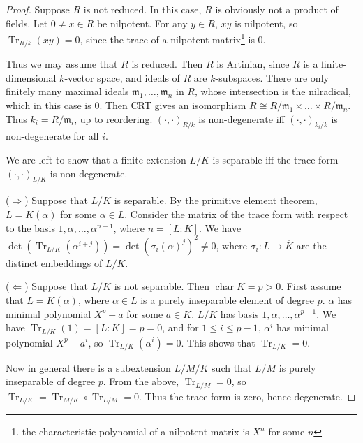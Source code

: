\documentclass[11pt]{article}
\theoremstyle{definition}
\theoremstyle{plain}
\theoremstyle{remark}
\DeclareMathOperator{\Char}{char}
\DeclareMathOperator{\Tr}{Tr}
\newcommand{\fm}{\mathfrak{m}}
\begin{document}
\begin{proof}
    Suppose $R$ is not reduced. In this case, $R$ is obviously not a product of fields. Let $0 \neq x \in R$ be nilpotent. For any $y \in R$, $xy$ is nilpotent, so $\Tr_{R/k}(xy) = 0$, since the trace of a nilpotent matrix\footnote{the characteristic polynomial of a nilpotent matrix is $X^n$ for some $n$} is $0$.

    Thus we may assume that $R$ is reduced. Then $R$ is Artinian, since $R$ is a finite-dimensional $k$-vector space, and ideals of $R$ are $k$-subspaces. There are only finitely many maximal ideals $\fm_1, \ldots, \fm_n$ in $R$, whose intersection is the nilradical, which in this case is $0$. Then CRT gives an isomorphism $R \cong R/\fm_1 \times \ldots \times R/\fm_n$. Thus $k_i = R / \fm_i$, up to reordering. $(\cdot, \cdot)_{R/k}$ is non-degenerate iff $(\cdot, \cdot)_{k_i/k}$ is non-degenerate for all $i$.

    We are left to show that a finite extension $L/K$ is separable iff the trace form $(\cdot, \cdot)_{L/K}$ is non-degenerate.

    \noindent ($\Rightarrow$) Suppose that $L/K$ is separable. By the primitive element theorem, $L = K(\alpha)$ for some $\alpha \in L$. Consider the matrix of the trace form with respect to the basis $1, \alpha, \ldots, \alpha^{n-1}$, where $n = [L : K]$. We have $\det(\Tr_{L/K}(\alpha^{i+j})) = \det(\sigma_i(\alpha)^j)^2 \neq 0$, where $\sigma_i : L \to \overline{K}$ are the distinct embeddings of $L/K$.

    \noindent ($\Leftarrow$) Suppose that $L/K$ is not separable. Then $\Char K = p > 0$. First assume that $L = K(\alpha)$, where $\alpha \in L$ is a purely inseparable element of degree $p$. $\alpha$ has minimal polynomial $X^p - a$ for some $a \in K$. $L / K$ has basis $1, \alpha, \ldots, \alpha^{p-1}$. We have $\Tr_{L/K}(1) = [L : K] = p = 0$, and for $1 \le i \le p-1$, $\alpha^i$ has minimal polynomial $X^p - a^i$, so $\Tr_{L/K}(\alpha^i) = 0$. This shows that $\Tr_{L/K} = 0$.

    Now in general there is a subextension $L/M/K$ such that $L/M$ is purely inseparable of degree $p$. From the above, $\Tr_{L/M} = 0$, so $\Tr_{L/K} = \Tr_{M/K} \circ \Tr_{L/M} = 0$. Thus the trace form is zero, hence degenerate.
\end{proof}
\end{document}

